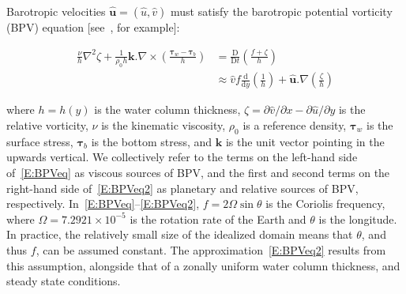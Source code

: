 \documentclass[draft]{agujournal2019}
\begin{document}
Barotropic velocities $\hat{\mathbf{u}} = (\hat{u}, \hat{v})$ must satisfy the barotropic potential vorticity (BPV) equation [see~, for example]:
\begin{linenomath*}
 \begin{align}
 \frac{\nu}{h}\nabla^2 \zeta + \frac{1}{\rho_0 h}\mathbf{k} . \nabla \times \left( \frac{\mathbf{\tau}_w - \mathbf{\tau}_b}{h}\right) &= \frac{\mathrm{D}}{\mathrm{D}t}\left( \frac{f + \zeta}{h}\right) \label{E:BPVeq} \\ &\approx  \hat{v} f  \frac{\mathrm{d}}{\mathrm{d}y} \left(\frac{1}{h}\right) + \hat{\mathbf{u}}.\nabla \left(\frac{\zeta}{h}\right) \label{E:BPVeq2}
 \end{align}
 \end{linenomath*}

where $h = h(y)$ is the water column thickness, $\zeta = \partial \hat{v} / \partial x - \partial \hat{u} / \partial y$ is the relative vorticity,  $\nu$ is the kinematic viscosity, $\rho_0$ is a reference density, $\mathbf{\tau}_w$ is the surface stress, $\mathbf{\tau}_b$ is the bottom stress, and $\mathbf{k}$ is the unit vector pointing in the upwards vertical. We collectively refer to the terms on the left-hand side of~\eqref{E:BPVeq} as viscous sources of BPV, and the first and second terms on the right-hand side of~\eqref{E:BPVeq2} as planetary and relative sources of BPV, respectively. In~\eqref{E:BPVeq}--\eqref{E:BPVeq2}, $f = 2\Omega \sin \theta$ is the Coriolis frequency, where $\Omega = 7.2921\times10^{-5}$ is the rotation rate of the Earth and $\theta$ is the longitude. In practice, the relatively small size of the idealized domain means that $\theta$, and thus $f$, can be assumed constant.  The approximation~\eqref{E:BPVeq2} results from this assumption, alongside that of a zonally uniform water column thickness, and steady state conditions.
\end{document}
